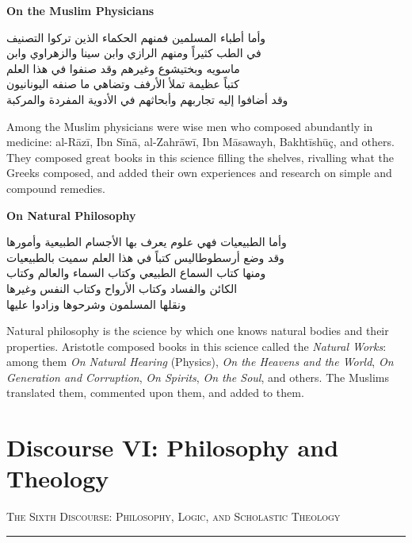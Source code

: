 \documentclass[11pt,a4paper]{article}
\newcommand{\ar}[1]{{\arabicfont\beginR #1\endR}}
\newcommand{\bilingual}[2]{%
  \noindent
  \begin{minipage}[t]{0.47\textwidth}
    \vspace{0pt}
    \begin{flushright}
    {\arabicfont\beginR #1\endR}
    \end{flushright}
  \end{minipage}%
  \hfill\vline\hfill
  \begin{minipage}[t]{0.47\textwidth}
    \vspace{0pt}
    #2
  \end{minipage}%
  \par\vspace{0.8em}
}
\newcommand{\bilingualsection}[2]{%
  \vspace{1em}%
  \noindent
  \begin{minipage}[t]{0.47\textwidth}
    \begin{flushright}
    \textsc{\color{sectioncolor}\ar{#1}}
    \end{flushright}
  \end{minipage}%
  \hfill
  \begin{minipage}[t]{0.47\textwidth}
    \textsc{\color{sectioncolor}#2}
  \end{minipage}%
  \par\vspace{0.5em}\hrule\vspace{0.8em}%
}
\newcommand{\bilingualsubsection}[2]{%
  \vspace{0.6em}%
  \noindent
  \begin{minipage}[t]{0.47\textwidth}
    \begin{flushright}
    \textbf{\color{sectioncolor}\ar{#1}}
    \end{flushright}
  \end{minipage}%
  \hfill
  \begin{minipage}[t]{0.47\textwidth}
    \textbf{\color{sectioncolor}#2}
  \end{minipage}%
  \par\vspace{0.4em}%
}
\begin{document}
\bilingualsubsection{في أطباء المسلمين}{On the Muslim Physicians}

\bilingual
{وأما أطباء المسلمين فمنهم الحكماء الذين تركوا التصنيف\\
في الطب كثيراً ومنهم الرازي وابن سينا والزهراوي وابن\\
ماسويه وبختیشوع وغيرهم وقد صنفوا في هذا العلم\\
كتباً عظيمة تملأ الأرفف وتضاهي ما صنفه اليونانيون\\
وقد أضافوا إليه تجاربهم وأبحاثهم في الأدوية المفردة والمركبة}
{Among the Muslim physicians were wise men who composed abundantly in
medicine: al-R\=az\=i, Ibn S\=in\=a, al-Zahr\=aw\=i, Ibn M\=asawayh,
Bakht\=ish\=u\c{c}, and others. They composed great books in this science
filling the shelves, rivalling what the Greeks composed, and added their
own experiences and research on simple and compound remedies.}

\vspace{0.5em}
\bilingualsubsection{في علم الطبيعيات}{On Natural Philosophy}

\bilingual
{وأما الطبيعيات فهي علوم يعرف بها الأجسام الطبيعية وأمورها\\
وقد وضع أرسطوطاليس كتباً في هذا العلم سميت بالطبيعيات\\
ومنها كتاب السماع الطبيعي وكتاب السماء والعالم وكتاب\\
الكائن والفساد وكتاب الأرواح وكتاب النفس وغيرها\\
ونقلها المسلمون وشرحوها وزادوا عليها}
{Natural philosophy is the science by which one knows natural bodies and
their properties. Aristotle composed books in this science called the
\textit{Natural Works}: among them \textit{On Natural Hearing}
(Physics), \textit{On the Heavens and the World}, \textit{On Generation and
Corruption}, \textit{On Spirits}, \textit{On the Soul}, and others. The
Muslims translated them, commented upon them, and added to them.}

\newpage

\section{Discourse VI: Philosophy and Theology}
\label{sec:VI}

\bilingualsection{الفن السادس في الفلسفة والمنطق والكلام}{The Sixth Discourse: Philosophy, Logic, and Scholastic Theology}
\end{document}
